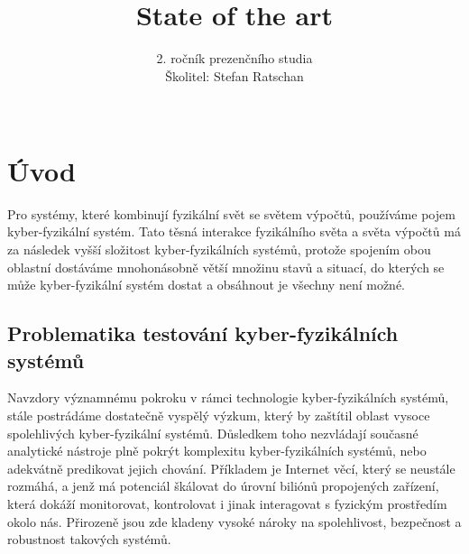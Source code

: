 \documentclass[conference,a4paper]{IEEEtran-CZ}
\begin{document}
\title{State of the art}

\author{
2. ročník prezenčního studia \\
Školitel: Stefan Ratschan \\
\\
}

\maketitle


\begin{abstract}


\end{abstract}

\IEEEpeerreviewmaketitle


\begin{IEEEkeywords}

\end{IEEEkeywords}

\maketitle

\section{Úvod}

Pro systémy, které kombinují fyzikální svět se světem výpočtů, používáme pojem kyber-fyzikální systém\cite{Rajeev:2015}.
Tato těsná interakce fyzikálního světa a světa výpočtů má za následek vyšší složitost 
kyber-fyzikálních systémů, protože spojením obou oblastní dostáváme mnohonásobně 
větší množinu stavů a situací, do kterých se může kyber-fyzikální systém dostat a 
obsáhnout je všechny není možné.

\subsection{Problematika testování kyber-fyzikálních systémů}

Navzdory významnému pokroku v rámci technologie kyber-fyzikálních systémů, stále postrádáme
dostatečně vyspělý výzkum, který by zaštítil oblast vysoce spolehlivých kyber-fyzikální systémů.
Důsledkem toho nezvládají současné analytické nástroje plně pokrýt komplexitu kyber-fyzikálních systémů,
nebo adekvátně predikovat jejich chování. Příkladem je Internet věcí, který se neustále rozmáhá, 
a jenž má potenciál škálovat do úrovní biliónů propojených zařízení, která dokáží monitorovat, 
kontrolovat i jinak interagovat s fyzickým prostředím okolo nás. Přirozeně jsou zde kladeny 
vysoké nároky na spolehlivost, bezpečnost a robustnost takových systémů\cite{NSF:CPS:2016}.
\end{document}
